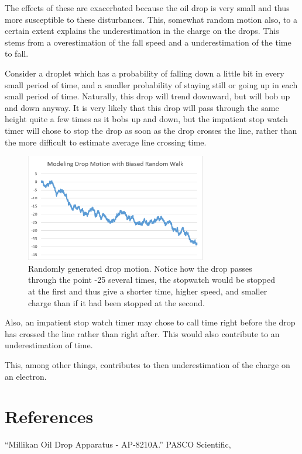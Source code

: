 \documentclass[]{article}
\begin{document}
The effects of these are exacerbated because the oil drop is very small and thus more susceptible to these disturbances. This, somewhat random motion also, to a certain extent explains the underestimation in the charge on the drops. This stems from a overestimation of the fall speed and a underestimation of the time to fall. 

Consider a droplet which has a probability of falling down a little bit in every small period of time, and a smaller probability of staying still or going up in each small period of time. Naturally, this drop will trend downward, but will bob up and down anyway. It is very likely that this drop will pass through the same height quite a few times as it bobs up and down, but the impatient stop watch timer will chose to stop the drop as soon as the drop crosses the line, rather than the more difficult to estimate average line crossing time.

\begin{figure}[h]
	\centering
	\begin{center}
		\includegraphics[width=3.1in]{bia}
	\end{center}
	\caption{Randomly generated drop motion. Notice how the drop passes through the point -25 several times, the stopwatch would be stopped at the first and thus give a shorter time, higher speed, and smaller charge than if it had been stopped at the second.}
\end{figure}


Also, an impatient stop watch timer may chose to call time right before the drop has crossed the line rather than right after. This would also contribute to an underestimation of time. 

This, among other things, contributes to then underestimation of the charge on an electron.

\section{References}
“Millikan Oil Drop Apparatus - AP-8210A.” PASCO Scientific, 
\end{document}
